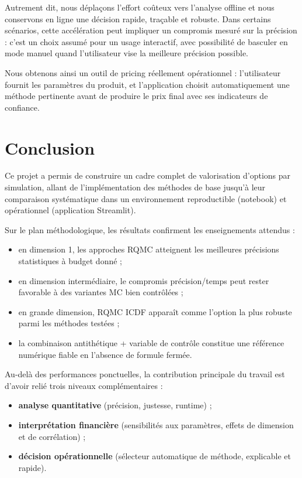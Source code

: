 ﻿\documentclass[11pt,a4paper]{article}
\begin{document}
Autrement dit, nous déplaçons l'effort coûteux vers l'analyse offline et nous conservons en ligne une décision rapide, traçable et robuste. Dans certains scénarios, cette accélération peut impliquer un compromis mesuré sur la précision : c'est un choix assumé pour un usage interactif, avec possibilité de basculer en mode manuel quand l'utilisateur vise la meilleure précision possible.

Nous obtenons ainsi un outil de pricing réellement opérationnel : l'utilisateur fournit les paramètres du produit, et l'application choisit automatiquement une méthode pertinente avant de produire le prix final avec ses indicateurs de confiance.


\section{Conclusion}

Ce projet a permis de construire un cadre complet de valorisation d'options par simulation, allant de l'implémentation des méthodes de base jusqu'à leur comparaison systématique dans un environnement reproductible (notebook) et opérationnel (application Streamlit).

Sur le plan méthodologique, les résultats confirment les enseignements attendus :
\begin{itemize}
    \item en dimension 1, les approches RQMC atteignent les meilleures précisions statistiques à budget donné ;
    \item en dimension intermédiaire, le compromis précision/temps peut rester favorable à des variantes MC bien contrôlées ;
    \item en grande dimension, RQMC ICDF apparaît comme l'option la plus robuste parmi les méthodes testées ;
    \item la combinaison antithétique + variable de contrôle constitue une référence numérique fiable en l'absence de formule fermée.
\end{itemize}

Au-delà des performances ponctuelles, la contribution principale du travail est d'avoir relié trois niveaux complémentaires :
\begin{itemize}
    \item \textbf{analyse quantitative} (précision, justesse, runtime) ;
    \item \textbf{interprétation financière} (sensibilités aux paramètres, effets de dimension et de corrélation) ;
    \item \textbf{décision opérationnelle} (sélecteur automatique de méthode, explicable et rapide).
\end{itemize}
\end{document}
